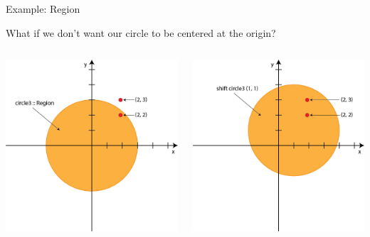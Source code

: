 \documentclass[8pt,aspectratio=169]{beamer}
\begin{document}
\begin{frame}[fragile]{Example: Region}

What if we don't want our circle to be centered at the origin?

\begin{columns}[onlytextwidth]
\begin{column}{0.5\textwidth}
\pause
\begin{center}
\includegraphics[scale=0.22]{figures/region}
\end{center}
\end{column}
\begin{column}{0.5\textwidth}
\pause
\begin{center}
\includegraphics[scale=0.22]{figures/shiftedRegion}

\end{center}
\end{column}
\end{columns}
\end{frame}
\end{document}
